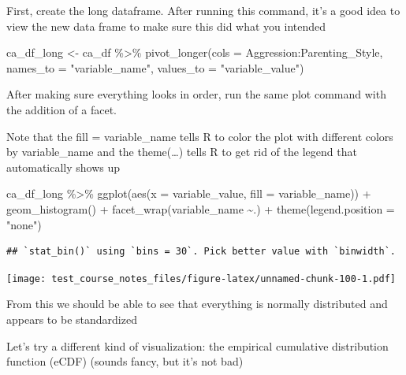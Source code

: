 \documentclass[
]{book}
\newenvironment{Shaded}{\begin{snugshade}}{\end{snugshade}}
\newcommand{\AttributeTok}[1]{\textcolor[rgb]{0.77,0.63,0.00}{#1}}
\newcommand{\FunctionTok}[1]{\textcolor[rgb]{0.00,0.00,0.00}{#1}}
\newcommand{\NormalTok}[1]{#1}
\newcommand{\OtherTok}[1]{\textcolor[rgb]{0.56,0.35,0.01}{#1}}
\newcommand{\SpecialCharTok}[1]{\textcolor[rgb]{0.00,0.00,0.00}{#1}}
\newcommand{\StringTok}[1]{\textcolor[rgb]{0.31,0.60,0.02}{#1}}
\begin{document}
First, create the long dataframe. After running this command, it's a good idea to view the new data frame to make sure this did what you intended

\begin{Shaded}
\begin{Highlighting}[]
\NormalTok{ca\_df\_long }\OtherTok{\textless{}{-}}\NormalTok{ ca\_df }\SpecialCharTok{\%\textgreater{}\%} 
  \FunctionTok{pivot\_longer}\NormalTok{(}\AttributeTok{cols =}\NormalTok{ Aggression}\SpecialCharTok{:}\NormalTok{Parenting\_Style, }\AttributeTok{names\_to =} \StringTok{"variable\_name"}\NormalTok{, }\AttributeTok{values\_to =} \StringTok{"variable\_value"}\NormalTok{)}
\end{Highlighting}
\end{Shaded}

After making sure everything looks in order, run the same plot command with the addition of a facet.

Note that the fill = variable\_name tells R to color the plot with different colors by variable\_name and the theme(\ldots) tells R to get rid of the legend that automatically shows up

\begin{Shaded}
\begin{Highlighting}[]
\NormalTok{ca\_df\_long }\SpecialCharTok{\%\textgreater{}\%} 
  \FunctionTok{ggplot}\NormalTok{(}\FunctionTok{aes}\NormalTok{(}\AttributeTok{x =}\NormalTok{ variable\_value, }\AttributeTok{fill =}\NormalTok{ variable\_name)) }\SpecialCharTok{+}
  \FunctionTok{geom\_histogram}\NormalTok{() }\SpecialCharTok{+}
  \FunctionTok{facet\_wrap}\NormalTok{(variable\_name }\SpecialCharTok{\textasciitilde{}}\NormalTok{.) }\SpecialCharTok{+}
  \FunctionTok{theme}\NormalTok{(}\AttributeTok{legend.position =} \StringTok{"none"}\NormalTok{)}
\end{Highlighting}
\end{Shaded}

\begin{verbatim}
## `stat_bin()` using `bins = 30`. Pick better value with `binwidth`.
\end{verbatim}

\texttt{[image: test\_course\_notes\_files/figure-latex/unnamed-chunk-100-1.pdf]}

From this we should be able to see that everything is normally distributed and appears to be standardized

Let's try a different kind of visualization: the empirical cumulative distribution function (eCDF) (sounds fancy, but it's not bad)
\end{document}
